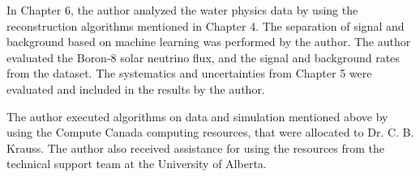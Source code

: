 In Chapter 6, the author analyzed the water physics data by using the reconstruction algorithms mentioned in Chapter 4. The separation of signal and background based on machine learning was performed by the author. The author evaluated the Boron-8 solar neutrino flux, and the signal and background rates from the dataset. The systematics and uncertainties from Chapter 5 were evaluated and included in the results by the author.

The author executed algorithms on data and simulation mentioned above by using the Compute Canada computing resources, that were allocated to Dr. C. B. Krauss. The author also received assistance for using the resources from the technical support team at the University of Alberta.